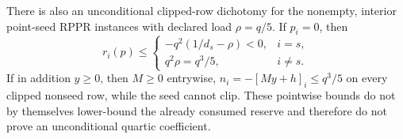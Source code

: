 \begin{proposition}
There is also an unconditional clipped-row dichotomy for the nonempty,
interior point-seed RPPR instances with declared load $\rho=q/5$.  If
$p_i=0$, then
\begin{equation}
 r_i(p)\leq
 \begin{cases}
  -q^2(1/d_s-\rho)<0,&i=s,\\
  q^2\rho=q^3/5,&i\neq s.
 \end{cases}
 \label{eq:clipped-row-post-residual-bound}
\end{equation}
If in addition $y\geq0$, then $M\geq0$ entrywise,
$n_i=-[My+h]_i\leq q^3/5$ on every clipped nonseed row, while the seed
cannot clip.  These pointwise bounds do not by themselves lower-bound the
already consumed reserve and therefore do not prove an unconditional
quartic coefficient.
\end{proposition}

